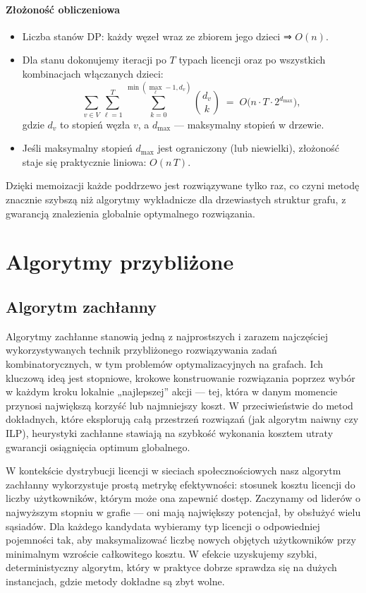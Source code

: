 \paragraph{Złożoność obliczeniowa}  
\begin{itemize}
  \item Liczba stanów DP: każdy węzeł wraz ze zbiorem jego dzieci ⇒ $O(n)$.
  \item Dla stanu dokonujemy iteracji po $T$ typach licencji oraz po wszystkich kombinacjach włączanych dzieci:  
    \[
      \sum_{v\in V}\sum_{\ell=1}^T \sum_{k=0}^{\min(\max_\ell-1,d_v)} \binom{d_v}{k}
      \;=\;
      O\!\bigl(n \cdot T \cdot 2^{d_{\max}}\bigr),
    \]
    gdzie $d_v$ to stopień węzła $v$, a $d_{\max}$ — maksymalny stopień w drzewie.
  \item Jeśli maksymalny stopień $d_{\max}$ jest ograniczony (lub niewielki), złożoność staje się praktycznie liniowa: $O(n\,T)$.
\end{itemize}
Dzięki memoizacji każde poddrzewo jest rozwiązywane tylko raz, co czyni metodę znacznie szybszą niż algorytmy wykładnicze dla drzewiastych struktur grafu, z gwarancją znalezienia globalnie optymalnego rozwiązania.  

\section{Algorytmy przybliżone}

\subsection{Algorytm zachłanny}

Algorytmy zachłanne stanowią jedną z najprostszych i zarazem najczęściej wykorzystywanych technik przybliżonego rozwiązywania zadań kombinatorycznych, w tym problemów optymalizacyjnych na grafach. Ich kluczową ideą jest stopniowe, krokowe konstruowanie rozwiązania poprzez wybór w każdym kroku lokalnie „najlepszej” akcji — tej, która w danym momencie przynosi największą korzyść lub najmniejszy koszt. W przeciwieństwie do metod dokładnych, które eksplorują całą przestrzeń rozwiązań (jak algorytm naiwny czy ILP), heurystyki zachłanne stawiają na szybkość wykonania kosztem utraty gwarancji osiągnięcia optimum globalnego.

W kontekście dystrybucji licencji w sieciach społecznościowych nasz algorytm zachłanny wykorzystuje prostą metrykę efektywności: stosunek kosztu licencji do liczby użytkowników, którym może ona zapewnić dostęp. Zaczynamy od liderów o najwyższym stopniu w grafie — oni mają największy potencjał, by obsłużyć wielu sąsiadów. Dla każdego kandydata wybieramy typ licencji o odpowiedniej pojemności tak, aby maksymalizować liczbę nowych objętych użytkowników przy minimalnym wzroście całkowitego kosztu. W efekcie uzyskujemy szybki, deterministyczny algorytm, który w praktyce dobrze sprawdza się na dużych instancjach, gdzie metody dokładne są zbyt wolne.

